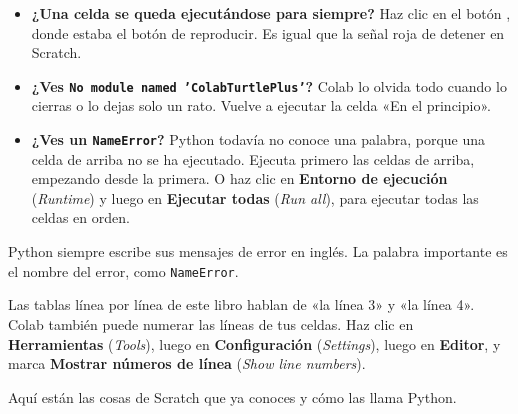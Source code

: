 \begin{watchout}
\begin{itemize}
  \item \textbf{¿Una celda se queda ejecutándose para siempre?} Haz clic en el botón \stopbtn{}, donde estaba el botón de reproducir. Es igual que la señal roja de detener en Scratch.
  \item \textbf{¿Ves \texttt{No module named 'ColabTurtlePlus'}?} Colab lo olvida todo cuando lo cierras o lo dejas solo un rato. Vuelve a ejecutar la celda «En el principio».
  \item \textbf{¿Ves un \texttt{NameError}?} Python todavía no conoce una palabra, porque una celda de arriba no se ha ejecutado. Ejecuta primero las celdas de arriba, empezando desde la primera. O haz clic en \textbf{Entorno de ejecución} (\textit{Runtime}) y luego en \textbf{Ejecutar todas} (\textit{Run all}), para ejecutar todas las celdas en orden.
\end{itemize}
Python siempre escribe sus mensajes de error en inglés. La palabra importante es el nombre del error, como \texttt{NameError}.
\end{watchout}

\begin{think}
Las tablas línea por línea de este libro hablan de «la línea 3» y «la línea 4». Colab también puede numerar las líneas de tus celdas. Haz clic en \textbf{Herramientas} (\textit{Tools}), luego en \textbf{Configuración} (\textit{Settings}), luego en \textbf{Editor}, y marca \textbf{Mostrar números de línea} (\textit{Show line numbers}).
\end{think}


Aquí están las cosas de Scratch que ya conoces y cómo las llama Python.


